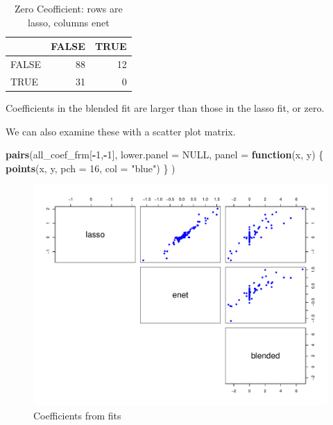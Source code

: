 \documentclass[
]{book}
\newenvironment{Shaded}{\begin{snugshade}}{\end{snugshade}}
\newcommand{\ControlFlowTok}[1]{\textcolor[rgb]{0.13,0.29,0.53}{\textbf{#1}}}
\newcommand{\DataTypeTok}[1]{\textcolor[rgb]{0.13,0.29,0.53}{#1}}
\newcommand{\DecValTok}[1]{\textcolor[rgb]{0.00,0.00,0.81}{#1}}
\newcommand{\KeywordTok}[1]{\textcolor[rgb]{0.13,0.29,0.53}{\textbf{#1}}}
\newcommand{\NormalTok}[1]{#1}
\newcommand{\OperatorTok}[1]{\textcolor[rgb]{0.81,0.36,0.00}{\textbf{#1}}}
\newcommand{\OtherTok}[1]{\textcolor[rgb]{0.56,0.35,0.01}{#1}}
\newcommand{\StringTok}[1]{\textcolor[rgb]{0.31,0.60,0.02}{#1}}
\begin{document}
\begin{table}

\caption{\label{tab:zreros}Zero Ceofficient: rows are lasso, columns enet}
\centering
\begin{tabular}[t]{l|r|r}
\hline
  & FALSE & TRUE\\
\hline
FALSE & 88 & 12\\
\hline
TRUE & 31 & 0\\
\hline
\end{tabular}
\end{table}

Coefficients in the blended fit are larger than those in the
lasso fit, or zero.

We can also examine these with a scatter plot matrix.

\begin{Shaded}
\begin{Highlighting}[]
\KeywordTok{pairs}\NormalTok{(all\_coef\_frm[}\OperatorTok{{-}}\DecValTok{1}\NormalTok{,}\OperatorTok{{-}}\DecValTok{1}\NormalTok{],}
  \DataTypeTok{lower.panel =} \OtherTok{NULL}\NormalTok{,}
  \DataTypeTok{panel =} \ControlFlowTok{function}\NormalTok{(x, y) \{}
    \KeywordTok{points}\NormalTok{(x, y, }\DataTypeTok{pch =} \DecValTok{16}\NormalTok{, }\DataTypeTok{col =} \StringTok{"blue"}\NormalTok{)}
\NormalTok{  \}}
\NormalTok{)}
\end{Highlighting}
\end{Shaded}

\begin{figure}
\centering
\includegraphics{Static/figures/pairsCoeffProf-1.pdf}
\caption{\label{fig:pairsCoeffProf}Coefficients from fits}
\end{figure}
\end{document}
